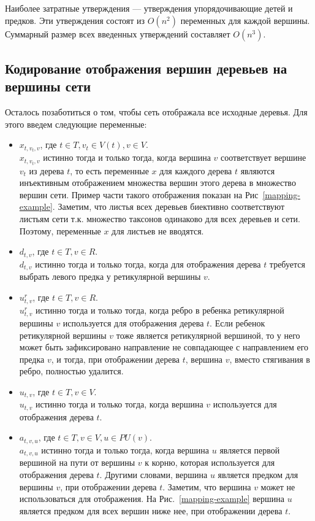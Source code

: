 Наиболее затратные утверждения --- утверждения упорядочивающие детей и предков.
Эти утверждения состоят из $O(n^2)$ переменных для каждой вершины.
Суммарный размер всех введенных утверждений составляет $O(n^3)$.

\FloatBarrier
\subsection{Кодирование отображения вершин деревьев на вершины сети}
\label{sec:mapping}

Осталось позаботиться о том, чтобы сеть отображала все исходные деревья.
Для этого введем следующие переменные:

\begin{itemize}

\item $x_{t,v_t,v}$, где $t \in T, v_t \in V(t), v \in V$. \\
$x_{t,v_t,v}$ истинно тогда и только тогда, когда вершина $v$ соответствует вершине $v_t$ из дерева $t$, то есть переменные $x$ для каждого дерева $t$ являются инъективным отображением множества вершин этого дерева в множество вершин сети. Пример части такого отображения показан на Рис~\ref{mapping-example}.
Заметим, что листья всех деревьев биективно соответствуют листьям сети т.к. множество таксонов одинаково для всех деревьев и сети.
Поэтому, переменные $x$ для листьев не вводятся.

\item $d_{t,v}$, где $t \in T, v \in R$. \\
$d_{t,v}$ истинно тогда и только тогда, когда для отображения дерева $t$ требуется выбрать левого предка у ретикулярной вершины $v$.

\item $u^r_{t,v}$, где $t \in T, v \in R$. \\
$u^r_{t,v}$ истинно тогда и только тогда, когда ребро в ребенка ретикулярной вершины $v$ используется для отображения дерева $t$.
Если ребенок ретикулярной вершины $v$ тоже является ретикулярной вершиной, то у него может быть зафиксировано направление не совпадающее с направлением его предка $v$, и тогда, при отображении дерева $t$, вершина $v$, вместо стягивания в ребро, полностью удалится.

\item $u_{t,v}$, где $t \in T, v \in V$. \\
$u_{t,v}$ истинно тогда и только тогда, когда вершина $v$ используется для отображения дерева $t$.

\item $a_{t,v,u}$, где $t \in T, v \in V, u \in PU(v)$. \\
$a_{t,v,u}$ истинно тогда и только тогда, когда вершина $u$ является первой вершиной на пути от вершины $v$ к корню, которая используется для отображения дерева $t$.
Другими словами, вершина $u$ является предком для вершины $v$, при отображении дерева $t$.
Заметим, что вершина $v$ может не использоваться для отображения.
На Рис.~\ref{mapping-example} вершина $u$ является предком для всех вершин ниже нее, при отображении дерева $t$.

\end{itemize}

